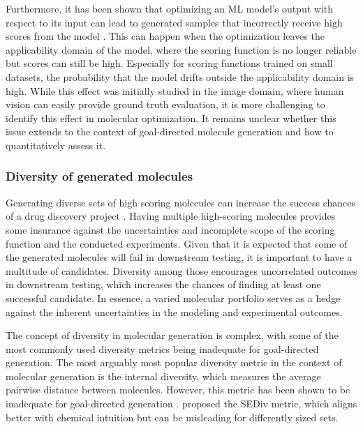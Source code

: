 Furthermore, it has been shown that optimizing an \ac{ML} model's output with respect to its input can
lead to generated samples that incorrectly receive high scores from the model
\citep{szegedyIntriguingPropertiesNeural2014,goodfellowExplainingHarnessingAdversarial2015}.
This can happen when the optimization leaves the applicability domain of the model, where
the scoring function is no longer reliable but scores can still be high. Especially for scoring
functions trained on small datasets, the probability that the model drifts outside the applicability
domain is high. While this effect was initially studied in the image domain, where human vision can easily provide
ground truth evaluation, it is more challenging to identify this effect in molecular optimization.
It remains unclear whether this issue extends to the context of goal-directed molecule generation
and how to quantitatively assess it.

\subsubsection{Diversity of generated molecules}
Generating diverse sets of high scoring molecules can increase the success chances of a drug
discovery project
\citep{martinDiverseViewpointsComputational2001,gorseDiversityMedicinalChemistry2006}. Having
multiple high-scoring molecules provides some insurance against the uncertainties and incomplete
scope of the scoring function and the conducted experiments. Given that it is expected that some of
the generated molecules will fail in downstream testing, it is important to have a multitude of
candidates. Diversity among those encourages uncorrelated outcomes in downstream testing, which
increases the chances of finding at least one successful candidate. In essence, a varied molecular
portfolio serves as a hedge against the inherent uncertainties in the modeling and experimental
outcomes.

The concept of diversity in molecular generation is complex, with some of the most commonly used
diversity metrics being inadequate for goal-directed generation. The most arguably most popular
diversity metric in the context of molecular generation is the internal diversity, which measures the
average pairwise distance between molecules. However, this metric has been shown to be inadequate for
goal-directed generation \citep{waldmanNovelAlgorithmsOptimization2000,xieMARSMarkovMolecular2021,thomasComparisonStructureLigandbased2021}.
\citet{thomasComparisonStructureLigandbased2021} proposed the \ac{SEDiv}
metric, which aligns better with chemical intuition but can be misleading for differently sized
sets.

